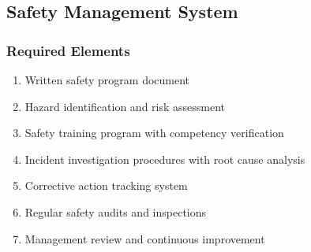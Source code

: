 \subsection{Safety Management System}

\subsubsection{Required Elements}
\begin{enumerate}[noitemsep]
    \item Written safety program document
    \item Hazard identification and risk assessment
    \item Safety training program with competency verification
    \item Incident investigation procedures with root cause analysis
    \item Corrective action tracking system
    \item Regular safety audits and inspections
    \item Management review and continuous improvement
\end{enumerate}